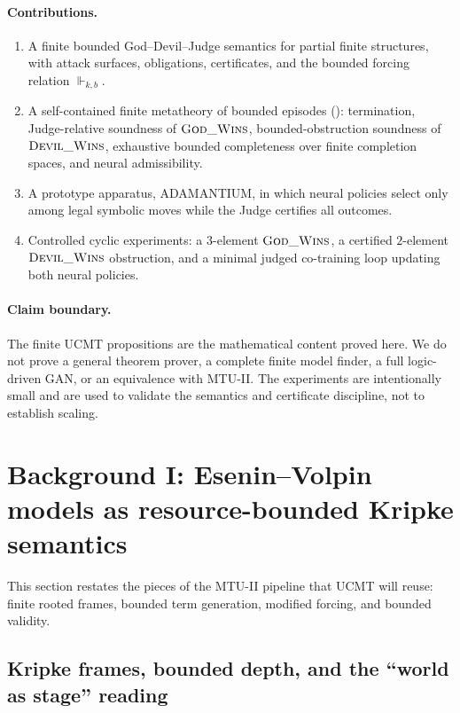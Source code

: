 \documentclass[11pt]{article}
\theoremstyle{definition}
\theoremstyle{plain}
\newcommand{\kbforces}{\Vdash_{k,b}}      %
\begin{document}
\paragraph{Contributions.}
\begin{enumerate}[leftmargin=1.5em]
\item A finite bounded God--Devil--Judge semantics for partial finite structures, with attack surfaces,
obligations, certificates, and the bounded forcing relation $\kbforces$.
\item A self-contained finite metatheory of bounded episodes (): termination,
Judge-relative soundness of $\textsc{God\_Wins}$, bounded-obstruction soundness of $\textsc{Devil\_Wins}$,
exhaustive bounded completeness over finite completion spaces, and neural admissibility.
\item A prototype apparatus, ADAMANTIUM, in which neural policies select only among legal symbolic moves
while the Judge certifies all outcomes.
\item Controlled cyclic experiments: a $3$-element $\textsc{God\_Wins}$, a certified
$2$-element $\textsc{Devil\_Wins}$ obstruction, and a minimal judged co-training loop updating both
neural policies.
\end{enumerate}

\paragraph{Claim boundary.}
The finite UCMT propositions are the mathematical content proved here.  We do not prove a general theorem
prover, a complete finite model finder, a full logic-driven GAN, or an equivalence with MTU-II.  The
experiments are intentionally small and are used to validate the semantics and certificate discipline, not
to establish scaling.

\section{Background I: Esenin--Volpin models as resource-bounded Kripke semantics}

This section restates the pieces of the MTU-II pipeline that UCMT will reuse: finite rooted frames,
bounded term generation, modified forcing, and bounded validity.

\subsection{Kripke frames, bounded depth, and the ``world as stage'' reading}
\end{document}
